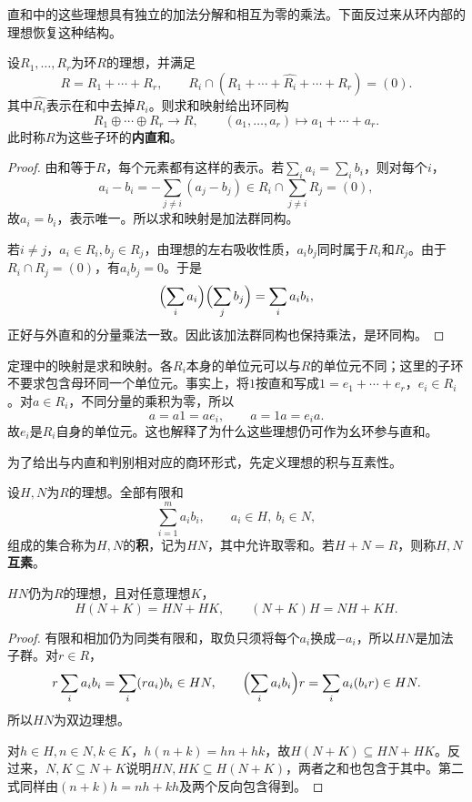 直和中的这些理想具有独立的加法分解和相互为零的乘法。下面反过来从环内部的理想恢复这种结构。

\begin{theorem}\label{p2:ring-internal-sum}
设$R_1,\ldots,R_r$为环$R$的理想，并满足
\[
R=R_1+\cdots+R_r,\qquad
R_i\cap(R_1+\cdots+\widehat{R_i}+\cdots+R_r)=(0).
\]
其中$\widehat{R_i}$表示在和中去掉$R_i$。则求和映射给出环同构
\[
R_1\oplus\cdots\oplus R_r\longrightarrow R,
\qquad(a_1,\ldots,a_r)\longmapsto a_1+\cdots+a_r.
\]
此时称$R$为这些子环的\textbf{内直和}。
\end{theorem}
\begin{proof}
由和等于$R$，每个元素都有这样的表示。若$\sum_i a_i=\sum_i b_i$，则对每个$i$，
\[
a_i-b_i=-\sum_{j\ne i}(a_j-b_j)
\in R_i\cap\sum_{j\ne i}R_j=(0),
\]
故$a_i=b_i$，表示唯一。所以求和映射是加法群同构。

若$i\ne j$，$a_i\in R_i,b_j\in R_j$，由理想的左右吸收性质，$a_ib_j$同时属于$R_i$和$R_j$。由于$R_i\cap R_j=(0)$，有$a_ib_j=0$。于是
\[
\Bigl(\sum_i a_i\Bigr)\Bigl(\sum_j b_j\Bigr)=\sum_i a_ib_i,
\]
正好与外直和的分量乘法一致。因此该加法群同构也保持乘法，是环同构。
\end{proof}

定理中的映射是求和映射。各$R_i$本身的单位元可以与$R$的单位元不同；这里的子环不要求包含母环同一个单位元。事实上，将$1$按直和写成$1=e_1+\cdots+e_r$，$e_i\in R_i$。对$a\in R_i$，不同分量的乘积为零，所以
\[
a=a1=ae_i,\qquad a=1a=e_i a.
\]
故$e_i$是$R_i$自身的单位元。这也解释了为什么这些理想仍可作为幺环参与直和。

为了给出与内直和判别相对应的商环形式，先定义理想的积与互素性。

\begin{definition}
设$H,N$为$R$的理想。全部有限和
\[
\sum_{i=1}^m a_ib_i,\qquad a_i\in H,\ b_i\in N,
\]
组成的集合称为$H,N$的\textbf{积}，记为$HN$，其中允许取零和。若$H+N=R$，则称$H,N$\textbf{互素}。
\end{definition}
\begin{proposition}
$HN$仍为$R$的理想，且对任意理想$K$，
\[
H(N+K)=HN+HK,\qquad(N+K)H=NH+KH.
\]
\end{proposition}
\begin{proof}
有限和相加仍为同类有限和，取负只须将每个$a_i$换成$-a_i$，所以$HN$是加法子群。对$r\in R$，
\[
r\sum_i a_ib_i=\sum_i(ra_i)b_i\in HN,
\qquad\Bigl(\sum_i a_ib_i\Bigr)r=\sum_i a_i(b_ir)\in HN.
\]
所以$HN$为双边理想。

对$h\in H,n\in N,k\in K$，$h(n+k)=hn+hk$，故$H(N+K)\subseteq HN+HK$。反过来，$N,K\subseteq N+K$说明$HN,HK\subseteq H(N+K)$，两者之和也包含于其中。第二式同样由$(n+k)h=nh+kh$及两个反向包含得到。
\end{proof}

